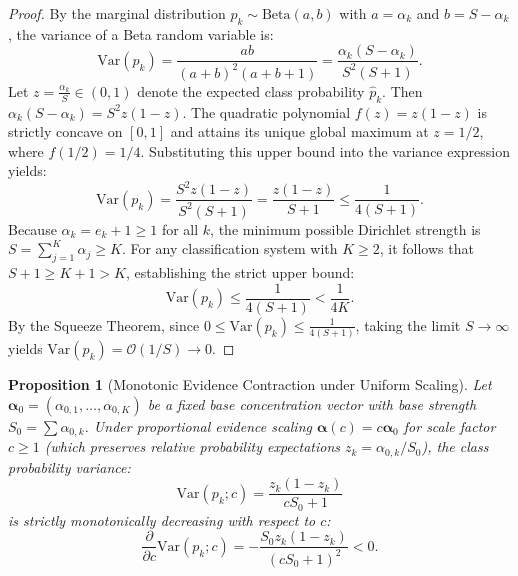 \documentclass[conference]{IEEEtran}
\newtheorem{proposition}{Proposition}
\begin{document}
\begin{proof}
By the marginal distribution $p_k \sim \mathrm{Beta}(a, b)$ with $a = \alpha_k$ and $b = S - \alpha_k$, the variance of a Beta random variable is:
\begin{equation}
\mathrm{Var}(p_k) = \frac{a b}{(a + b)^2 (a + b + 1)} = \frac{\alpha_k(S - \alpha_k)}{S^2(S + 1)}.
\end{equation}
Let $z = \frac{\alpha_k}{S} \in (0, 1)$ denote the expected class probability $\hat{p}_k$. Then $\alpha_k(S - \alpha_k) = S^2 z(1 - z)$. The quadratic polynomial $f(z) = z(1 - z)$ is strictly concave on $[0, 1]$ and attains its unique global maximum at $z = 1/2$, where $f(1/2) = 1/4$. Substituting this upper bound into the variance expression yields:
\begin{equation}
\mathrm{Var}(p_k) = \frac{S^2 z(1 - z)}{S^2(S + 1)} = \frac{z(1 - z)}{S + 1} \le \frac{1}{4(S + 1)}.
\end{equation}
Because $\alpha_k = e_k + 1 \ge 1$ for all $k$, the minimum possible Dirichlet strength is $S = \sum_{j=1}^K \alpha_j \ge K$. For any classification system with $K \ge 2$, it follows that $S + 1 \ge K + 1 > K$, establishing the strict upper bound:
\begin{equation}
\mathrm{Var}(p_k) \le \frac{1}{4(S + 1)} < \frac{1}{4K}.
\end{equation}
By the Squeeze Theorem, since $0 \le \mathrm{Var}(p_k) \le \frac{1}{4(S+1)}$, taking the limit $S \to \infty$ yields $\mathrm{Var}(p_k) = \mathcal{O}(1/S) \to 0$.
\end{proof}

\begin{proposition}[Monotonic Evidence Contraction under Uniform Scaling]
\label{prop:uniform_scaling}
Let $\boldsymbol{\alpha}_0 = (\alpha_{0,1}, \dots, \alpha_{0,K})$ be a fixed base concentration vector with base strength $S_0 = \sum \alpha_{0,k}$. Under proportional evidence scaling $\boldsymbol{\alpha}(c) = c \boldsymbol{\alpha}_0$ for scale factor $c \ge 1$ (which preserves relative probability expectations $z_k = \alpha_{0,k} / S_0$), the class probability variance:
\begin{equation}
\mathrm{Var}(p_k; c) = \frac{z_k(1 - z_k)}{c S_0 + 1}
\end{equation}
is strictly monotonically decreasing with respect to $c$:
\begin{equation}
\frac{\partial}{\partial c} \mathrm{Var}(p_k; c) = -\frac{S_0 z_k(1 - z_k)}{(c S_0 + 1)^2} < 0.
\end{equation}
\end{proposition}
\end{document}
